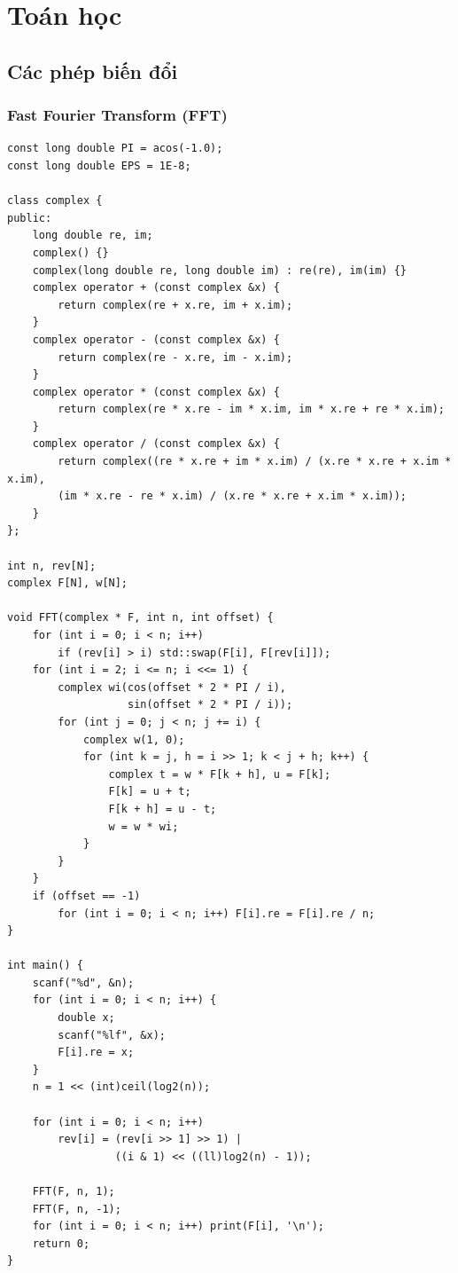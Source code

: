 \documentclass[11pt]{article}
\begin{document}
\section{Toán học}

\subsection{Các phép biến đổi}

\subsubsection{Fast Fourier Transform (FFT)}

\begingroup
\footnotesize
\begin{verbatim}
const long double PI = acos(-1.0);
const long double EPS = 1E-8;

class complex {
public:
    long double re, im;
    complex() {}
    complex(long double re, long double im) : re(re), im(im) {}
    complex operator + (const complex &x) {
        return complex(re + x.re, im + x.im);
    }
    complex operator - (const complex &x) {
        return complex(re - x.re, im - x.im);
    }
    complex operator * (const complex &x) {
        return complex(re * x.re - im * x.im, im * x.re + re * x.im);
    }
    complex operator / (const complex &x) {
        return complex((re * x.re + im * x.im) / (x.re * x.re + x.im * x.im),
        (im * x.re - re * x.im) / (x.re * x.re + x.im * x.im));
    }
};

int n, rev[N];
complex F[N], w[N];

void FFT(complex * F, int n, int offset) {
    for (int i = 0; i < n; i++)
        if (rev[i] > i) std::swap(F[i], F[rev[i]]);
    for (int i = 2; i <= n; i <<= 1) {
        complex wi(cos(offset * 2 * PI / i),
                   sin(offset * 2 * PI / i));
        for (int j = 0; j < n; j += i) {
            complex w(1, 0);
            for (int k = j, h = i >> 1; k < j + h; k++) {
                complex t = w * F[k + h], u = F[k];
                F[k] = u + t;
                F[k + h] = u - t;
                w = w * wi;
            }
        }
    }
    if (offset == -1)
        for (int i = 0; i < n; i++) F[i].re = F[i].re / n;
}

int main() {
    scanf("%d", &n);
    for (int i = 0; i < n; i++) {
        double x;
        scanf("%lf", &x);
        F[i].re = x;
    }
    n = 1 << (int)ceil(log2(n));

    for (int i = 0; i < n; i++)
        rev[i] = (rev[i >> 1] >> 1) |
                 ((i & 1) << ((ll)log2(n) - 1));

    FFT(F, n, 1);
    FFT(F, n, -1);
    for (int i = 0; i < n; i++) print(F[i], '\n');
    return 0;
}
\end{verbatim}
\endgroup
\end{document}
